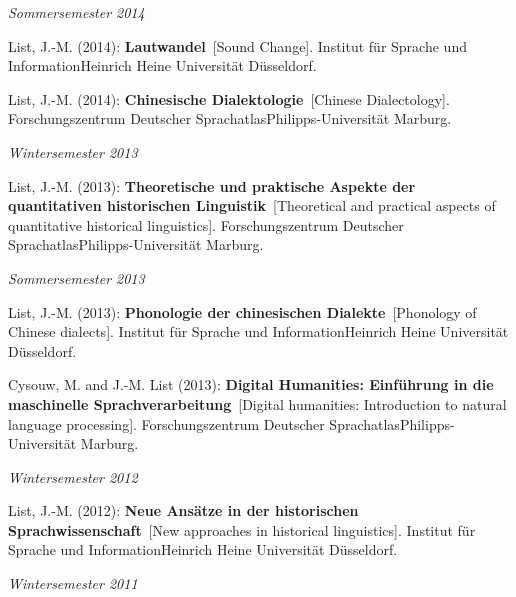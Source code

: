 \noindent\textit{Sommersemester 2014}\par\nopagebreak\vspace{0.25cm}
\nopagebreak\noindent List, J.-M. (2014): \textbf{Lautwandel}\ [Sound Change]. Institut für Sprache und InformationHeinrich Heine Universität Düsseldorf.\vspace{0.25cm}
\par
\nopagebreak\noindent List, J.-M. (2014): \textbf{Chinesische Dialektologie}\ [Chinese Dialectology]. Forschungszentrum Deutscher SprachatlasPhilipps-Universität Marburg.\vspace{0.25cm}
\par
\noindent\textit{Wintersemester 2013}\par\nopagebreak\vspace{0.25cm}
\nopagebreak\noindent List, J.-M. (2013): \textbf{Theoretische und praktische Aspekte der quantitativen historischen Linguistik}\ [Theoretical and practical aspects of quantitative historical linguistics]. Forschungszentrum Deutscher SprachatlasPhilipps-Universität Marburg.\vspace{0.25cm}
\par
\noindent\textit{Sommersemester 2013}\par\nopagebreak\vspace{0.25cm}
\nopagebreak\noindent List, J.-M. (2013): \textbf{Phonologie der chinesischen Dialekte}\ [Phonology of Chinese dialects]. Institut für Sprache und InformationHeinrich Heine Universität Düsseldorf.\vspace{0.25cm}
\par
\nopagebreak\noindent Cysouw, M. and J.-M. List (2013): \textbf{Digital Humanities: Einführung in die maschinelle Sprachverarbeitung}\ [Digital humanities: Introduction to natural language processing]. Forschungszentrum Deutscher SprachatlasPhilipps-Universität Marburg.\vspace{0.25cm}
\par
\noindent\textit{Wintersemester 2012}\par\nopagebreak\vspace{0.25cm}
\nopagebreak\noindent List, J.-M. (2012): \textbf{Neue Ansätze in der historischen Sprachwissenschaft}\ [New approaches in historical linguistics]. Institut für Sprache und InformationHeinrich Heine Universität Düsseldorf.\vspace{0.25cm}
\par
\noindent\textit{Wintersemester 2011}\par\nopagebreak\vspace{0.25cm}
